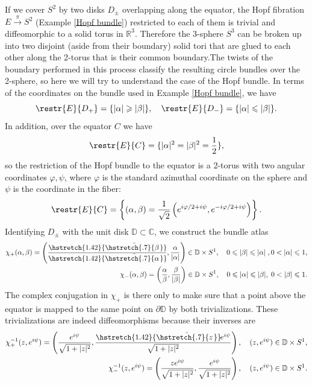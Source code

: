 \documentclass[english,letterpaper]{article}%
\numberwithin{equation}{section}
\numberwithin{figure}{section}
\numberwithin{table}{section}
\theoremstyle{definition}
\theoremstyle{definition}
\theoremstyle{definition}
\theoremstyle{plain}
\theoremstyle{plain}
\theoremstyle{plain}
\theoremstyle{plain}
\theoremstyle{remark}
\theoremstyle{remark}
\renewcommand{\geq}{\geqslant}
\renewcommand{\leq}{\leqslant}
\newcommand\wb[1]{\hstretch{1.42}{\bar{\hstretch{.7}{#1\mkern2mu}}}\mkern-2mu}
\begin{document}
\begin{example}
    If we cover $S^2$ by two disks $D_\pm$ overlapping along the equator, the Hopf fibration $E\overset\pi\to S^2$ (Example \ref{Hopf bundle}) restricted to each of them is trivial and diffeomorphic to a solid torus in $\mathbb{R}^3$. Therefore the 3-sphere $S^3$ can be broken up into two disjoint (aside from their boundary) solid tori that are glued to each other along the 2-torus that is their common boundary.The twists of the boundary performed in this process classify the resulting circle bundles over the 2-sphere, so here we will try to understand the case of the Hopf bundle. In terms of the coordinates on the bundle used in Example \ref{Hopf bundle}, we have 
    \[\restr{E}{D_+}=\{|\alpha|\geq|\beta|\},\quad \restr{E}{D_-}=\{|\alpha|\leq|\beta|\}.\]
    In addition, over the equator $C$ we have 
    \[\restr{E}{C}=\{|\alpha|^2=|\beta|^2=\frac12\},\]
    so the restriction of the Hopf bundle to the equator is a 2-torus with two angular coordinates $\varphi,\psi$, where $\varphi$ is the standard azimuthal coordinate on the sphere and $\psi$ is the coordinate in the fiber:
    \[\restr{E}{C}=\left\{(\alpha,\beta)=\frac{1}{\sqrt{2}}\left(e^{i\varphi/2+i\psi},e^{-i\varphi/2+i\psi}\right)\right\}.\]
    Identifying $D_\pm$ with the unit disk $\mathbb{D}\subset\mathbb{C}$, we construct the bundle atlas
    \begin{align}
        \chi_+(\alpha,\beta)=\left(\frac{\wb\beta}{\wb\alpha},\frac{\alpha}{|\alpha|}\right)\in\mathbb{D}\times S^1,\quad 0\leq|\beta|\leq |\alpha|\;,0<|\alpha|\leq 1,\\
        \chi_-(\alpha,\beta)=\left(\frac{\alpha}{\beta},\frac{\beta}{|\beta|}\right)\in\mathbb{D}\times S^1,\quad 0\leq|\alpha|\leq|\beta|,\; 0<|\beta|\leq 1.
    \end{align}
    The complex conjugation in $\chi_+$ is there only to make sure that a point above the equator is mapped to the same point on $\partial\mathbb{D}$ by both trivializations. These trivializations are indeed diffeomorphisms because their inverses are
    \begin{align}
        \chi_+^{-1}(z,e^{i\psi})=\left(\frac{e^{i\psi}}{{\sqrt{1+|z|^2}}},\frac{\wb{z}e^{i\psi}}{{\sqrt{1+|z|^2}}}\right),\quad (z,e^{i\psi})\in \mathbb{D}\times S^1,\\
        \chi_-^{-1}(z,e^{i\psi})=\left(\frac{ze^{i\psi}}{{\sqrt{1+|z|^2}}},\frac{e^{i\psi}}{{\sqrt{1+|z|^2}}}\right),\quad (z,e^{i\psi})\in \mathbb{D}\times S^1.
    \end{align}

\end{example}
\end{document}
